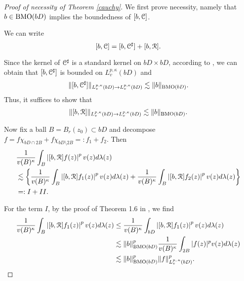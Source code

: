 \documentclass[11pt,a4paper]{amsart}
\numberwithin{equation}{section}
\begin{document}
{\begin{proof}[Proof of necessity of  Theorem \ref{cauchy}]
\smallskip


We first prove necessity, namely that $b\in {\rm BMO}(bD)$ implies the boundedness of $[b, \EuScript C]$.


We can write
$$[b,\EuScript C]=[b,\EuScript C^\sharp]+[b,\EuScript R].$$




Since the kernel of $\EuScript C^\sharp$ is a standard kernel on $bD\times bD$, according to \cite[Theorerm 3.4]{KS},  we can obtain that $[b, \EuScript C^\sharp]$ is bounded on  $L_v^{p,\kappa}(bD)$ and
\begin{align*}
\|[b,\EuScript C^\sharp]\|_{L_v^{p,\kappa}(bD)\rightarrow L_v^{p,\kappa}(bD)}\lesssim \|b\|_{{\rm BMO} (bD)}.
\end{align*}
Thus, it suffices to show that
\begin{align}\label{[b,R] bounded}
\|[b,\EuScript R]\|_{L_v^{p,\kappa}(bD)\rightarrow L_v^{p,\kappa}(bD)}\lesssim \|b\|_{{\rm BMO} (bD)}.
\end{align}

Now fix a ball $B=B_r(z_0)\subset bD$ and decompose $f=f\chi_{bD\cap 2B}+f\chi_{bD\setminus 2B}=:f_1+f_2$. Then
\begin{align*}
&{1\over v(B)^{\kappa}}\int_B\left|[b,\EuScript R] f(z)  \right|^pv(z)d\lambda(z)\\
&\lesssim \bigg\{ {1\over v(B)^{\kappa}}\int_B\left|[b,\EuScript R] f_1(z)  \right|^pv(z)d\lambda(z)+{1\over v(B)^{\kappa}}\int_B\left|[b,\EuScript R] f_2(z)  \right|^pv(z)d\lambda(z)\bigg\}\\
&=:I+II.
\end{align*}


For the term $I$, by the proof of Theorem 1.6 in \cite{DLLW}, we find
\begin{align*}
{1\over v(B)^{\kappa}}\int_B\left|[b,\EuScript R] f_1(z)  \right|^pv(z)d\lambda(z)
&\leq{1\over v(B)^{\kappa}} \int_{bD}\left|[b,\EuScript R] f_1(z)\right|^pv(z)d\lambda(z)\\
&\lesssim \|b\|^p_{ {\rm BMO}(bD) }{1\over v(B)^{\kappa}}\int_{2B}|f(z)|^pv(z)d\lambda(z)\\
&\lesssim\|b\|^p_{ {\rm BMO}(bD) }\|f\|^p_{L_v^{p,\,\kappa}(bD)}.
\end{align*}



\end{proof}}
\end{document}
